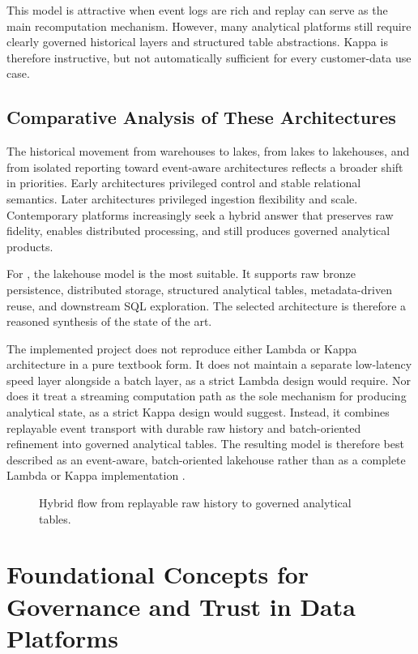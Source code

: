 This model is attractive when event logs are rich and replay can serve as the main recomputation mechanism. However, many analytical platforms still require clearly governed historical layers and structured table abstractions. Kappa is therefore instructive, but not automatically sufficient for every customer-data use case.

\subsection{Comparative Analysis of These Architectures}
The historical movement from warehouses to lakes, from lakes to lakehouses, and from isolated reporting toward event-aware architectures reflects a broader shift in priorities. Early architectures privileged control and stable relational semantics. Later architectures privileged ingestion flexibility and scale. Contemporary platforms increasingly seek a hybrid answer that preserves raw fidelity, enables distributed processing, and still produces governed analytical products.

For \projectname, the lakehouse model is the most suitable. It supports raw bronze persistence, distributed storage, structured analytical tables, metadata-driven reuse, and downstream SQL exploration. The selected architecture is therefore a reasoned synthesis of the state of the art.

The implemented project does not reproduce either Lambda or Kappa architecture in a pure textbook form. It does not maintain a separate low-latency speed layer alongside a batch layer, as a strict Lambda design would require. Nor does it treat a streaming computation path as the sole mechanism for producing analytical state, as a strict Kappa design would suggest. Instead, it combines replayable event transport with durable raw history and batch-oriented refinement into governed analytical tables. The resulting model is therefore best described as an event-aware, batch-oriented lakehouse rather than as a complete Lambda or Kappa implementation \cite{marz2015bigdata,kreps2014questioning,armbrust2021lakehouse}.

\begin{figure}[H]
    \centering
    
    \caption{Hybrid flow from replayable raw history to governed analytical tables.}
    \label{fig:hybrid-processing-logic}
\end{figure}

\section{Foundational Concepts for Governance and Trust in Data Platforms}

